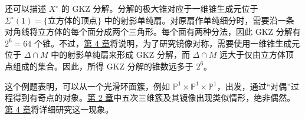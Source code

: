\begin{example}
还可以描述 $X^\circ$ 的 GKZ 分解。分解的极大锥对应于一维锥生成元位于 $\Sigma^\circ(1)=\{\text{立方体的顶点}\}$ 中的射影单纯扇。对原扇作单纯细分时，需要沿一条对角线将立方体的每个面分成两个三角形。每个面有两种分法，因此 GKZ 分解有 $2^6=64$ 个锥。不过，\hyperref[chap:mirror-constructions]{第 4 章}将说明，为了研究镜像对称，需要使用一维锥生成元位于 $\Delta\cap M$ 中的射影单纯扇来形成 GKZ 分解，而 $\Delta\cap M$ 远大于仅由立方体顶点组成的集合。因此，所得 GKZ 分解的锥数远多于 $2^6$。

这个例题表明，可以从一个光滑环面簇，例如 $\mathbb P^1\times\mathbb P^1\times\mathbb P^1$，出发，通过“对偶”过程得到有奇点的对象。\hyperref[chap:quintic]{第 2 章}中五次三维簇及其镜像出现类似情形，绝非偶然。\hyperref[chap:mirror-constructions]{第 4 章}将详细研究这一现象。
\end{example}
